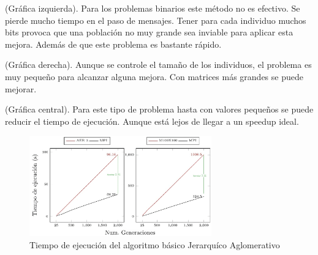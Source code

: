 (Gráfica izquierda). Para los problemas binarios este método no es efectivo. Se pierde mucho tiempo en el paso de mensajes. Tener para cada individuo muchos bits provoca que una población no muy grande sea inviable para aplicar esta mejora. Además de que este problema es bastante rápido.

(Gráfica derecha). Aunque se controle el tamaño de los individuos, el problema es muy pequeño para alcanzar alguna mejora. Con matrices más grandes se puede mejorar.

(Gráfica central). Para este tipo de problema hasta con valores pequeños se puede reducir el tiempo de ejecución. Aunque está lejos de llegar a un speedup ideal.




\begin{figure}[!h]
	\centering
	\includegraphics[width=0.7\textwidth]{images/chapter_4/pev_mpi1}
	\caption{Tiempo de ejecución del algoritmo básico Jerarquíco Aglomerativo}
	\label{fig:MPI1.2 - Dividir Poblacion + Speedup}
\end{figure}

